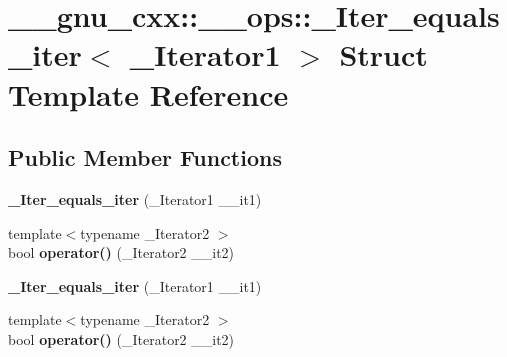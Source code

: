 \hypertarget{struct____gnu__cxx_1_1____ops_1_1__Iter__equals__iter}{\section{\+\_\+\+\_\+gnu\+\_\+cxx\+:\+:\+\_\+\+\_\+ops\+:\+:\+\_\+\+Iter\+\_\+equals\+\_\+iter$<$ \+\_\+\+Iterator1 $>$ Struct Template Reference}
\label{struct____gnu__cxx_1_1____ops_1_1__Iter__equals__iter}
}
\subsection*{Public Member Functions}
\begin{DoxyCompactItemize}
\item 
\hypertarget{struct____gnu__cxx_1_1____ops_1_1__Iter__equals__iter_a04dac10b57a1e48cae799bed465c167e}{{\bfseries \+\_\+\+Iter\+\_\+equals\+\_\+iter} (\+\_\+\+Iterator1 \+\_\+\+\_\+it1)}\label{struct____gnu__cxx_1_1____ops_1_1__Iter__equals__iter_a04dac10b57a1e48cae799bed465c167e}

\item 
\hypertarget{struct____gnu__cxx_1_1____ops_1_1__Iter__equals__iter_a9f6c45e28168181db751e3def5f22cfa}{{\footnotesize template$<$typename \+\_\+\+Iterator2 $>$ }\\bool {\bfseries operator()} (\+\_\+\+Iterator2 \+\_\+\+\_\+it2)}\label{struct____gnu__cxx_1_1____ops_1_1__Iter__equals__iter_a9f6c45e28168181db751e3def5f22cfa}

\item 
\hypertarget{struct____gnu__cxx_1_1____ops_1_1__Iter__equals__iter_a04dac10b57a1e48cae799bed465c167e}{{\bfseries \+\_\+\+Iter\+\_\+equals\+\_\+iter} (\+\_\+\+Iterator1 \+\_\+\+\_\+it1)}\label{struct____gnu__cxx_1_1____ops_1_1__Iter__equals__iter_a04dac10b57a1e48cae799bed465c167e}

\item 
\hypertarget{struct____gnu__cxx_1_1____ops_1_1__Iter__equals__iter_a9f6c45e28168181db751e3def5f22cfa}{{\footnotesize template$<$typename \+\_\+\+Iterator2 $>$ }\\bool {\bfseries operator()} (\+\_\+\+Iterator2 \+\_\+\+\_\+it2)}\label{struct____gnu__cxx_1_1____ops_1_1__Iter__equals__iter_a9f6c45e28168181db751e3def5f22cfa}

\end{DoxyCompactItemize}
